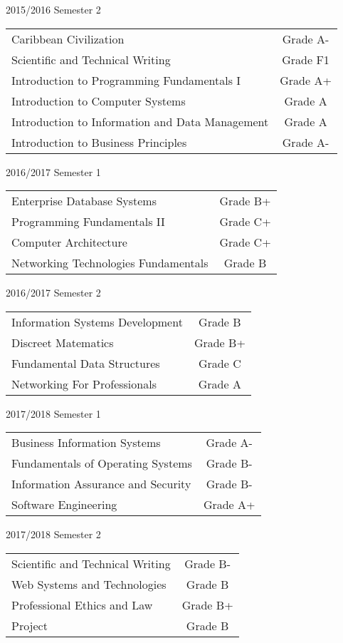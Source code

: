 \documentclass[10pt,a4paper,normalphoto]{altacv}
\begin{document}
\divider

2015/2016 Semester 2

\medskip
\begin{tabular}{ l c }
Caribbean Civilization &  Grade A-\\
Scientific and Technical Writing  & Grade F1\\
Introduction to Programming Fundamentals I & Grade A+\\
Introduction to Computer Systems & Grade A\\
Introduction to Information and Data Management & Grade A\\
Introduction to Business Principles & Grade A-
\end{tabular}

\divider

2016/2017 Semester 1

\medskip
\begin{tabular}{ l c }
Enterprise Database Systems &  Grade B+\\
Programming Fundamentals II  & Grade C+\\
Computer Architecture & Grade C+\\
Networking Technologies Fundamentals & Grade B
\end{tabular}

\divider

2016/2017 Semester 2

\medskip
\begin{tabular}{ l c }
Information Systems Development &  Grade B\\
Discreet Matematics  & Grade B+\\
Fundamental Data Structures & Grade C\\
Networking For Professionals & Grade A
\end{tabular}

\divider

2017/2018 Semester 1

\medskip
\begin{tabular}{ l c }
Business Information Systems &  Grade A-\\
Fundamentals of Operating Systems & Grade B-\\
Information Assurance and Security & Grade B-\\
Software Engineering & Grade A+
\end{tabular}

\divider

2017/2018 Semester 2

\medskip
\begin{tabular}{ l c }
Scientific and Technical Writing &  Grade B-\\
Web Systems and Technologies & Grade B\\
Professional Ethics and Law & Grade B+\\
Project & Grade B
\end{tabular}
\end{document}
